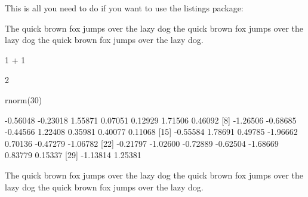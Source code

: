 \documentclass{article}\usepackage[]{graphicx}\usepackage[]{color}
\begin{document}
This is all you need to do if you want to use the listings package:



The quick brown fox jumps over the lazy dog the quick brown fox jumps over the
lazy dog the quick brown fox jumps over the lazy dog.

\begin{Schunk}
\begin{Sinput}
1 + 1
\end{Sinput}
\begin{Soutput}
[1] 2
\end{Soutput}
\begin{Sinput}
rnorm(30)
\end{Sinput}
\begin{Soutput}
 [1] -0.56048 -0.23018  1.55871  0.07051  0.12929  1.71506  0.46092
 [8] -1.26506 -0.68685 -0.44566  1.22408  0.35981  0.40077  0.11068
[15] -0.55584  1.78691  0.49785 -1.96662  0.70136 -0.47279 -1.06782
[22] -0.21797 -1.02600 -0.72889 -0.62504 -1.68669  0.83779  0.15337
[29] -1.13814  1.25381
\end{Soutput}
\end{Schunk}

The quick brown fox jumps over the lazy dog the quick brown fox jumps over the
lazy dog the quick brown fox jumps over the lazy dog.
\end{document}
